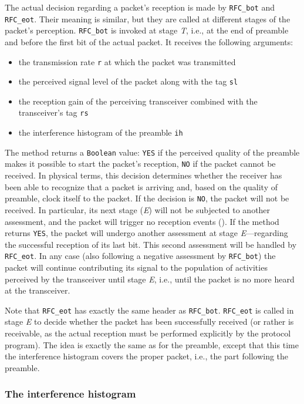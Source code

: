 The actual decision regarding a packet's reception is made by
{\tt RFC\_bot} and {\tt RFC\_eot}.
Their meaning is similar, but they are called at different stages of the
packet's perception.
{\tt RFC\_bot} is invoked at stage {\em T}, i.e., at the end of preamble and
before the first bit of the actual packet.
It receives the following arguments:
\begin{itemize}
\item
the transmission rate {\tt r} at which the packet was transmitted
\item
the perceived signal level of the packet along with the tag {\tt sl}
\item
the reception gain of the perceiving transceiver combined with the
transceiver's tag {\tt rs}
\item
the interference histogram of the preamble {\tt ih}
\end{itemize}
\noindent
The method returns a {\tt Boolean} value: {\tt YES} if the
perceived quality of the preamble makes it possible to start the packet's
reception, {\tt NO} if the packet cannot be received.
In physical terms, this decision determines whether the receiver has been
able to recognize that a packet is arriving and, based on the quality of
preamble, clock itself to the packet.
If the decision is {\tt NO}, the packet will not be received.
In particular, its next stage ({\em E\/}) will not be subjected to another
assessment, and the packet will trigger no reception events
().
If the method returns {\tt YES}, the packet will undergo another
assessment at stage {\em E\/}---regarding the successful
reception of its last bit.
This second assessment will be handled by {\tt RFC\_eot}.
In any case (also following a negative assessment by {\tt RFC\_bot})
the packet will continue contributing its signal to the population of
activities perceived by the transceiver until stage {\em E}, i.e., until
the packet is no more heard at the transceiver.

Note that {\tt RFC\_eot} has exactly
the same header as {\tt RFC\_bot}.
{\tt RFC\_eot} is called in stage {\em E\/} to decide whether the packet
has been successfully received (or rather is receivable, as the actual
reception must be performed explicitly by the protocol program).
The idea is exactly the same as for the preamble, except that this time
the interference histogram covers the proper packet, i.e., the part following
the preamble.

\subsubsection{The interference histogram}
\label{rm_tr_ra_ih}

